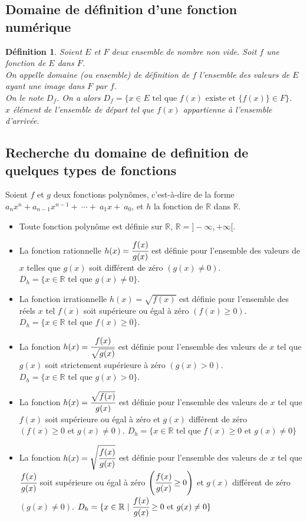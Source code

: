 \documentclass[a4paper, 12pt]{report}
\newtheorem{definition}{Définition}[section]
\begin{document}
            \subsection{Domaine de définition d'une fonction numérique}
            \begin{definition}
                Soient $E$ et $F$ deux ensemble de nombre non vide. Soit $f$ une fonction de $E$ dans $F$.\\ 
                On appelle domaine (ou ensemble) de définition de $f$ l'ensemble des valeurs de $E$ ayant une image dans $F$ par $f$.\\ 
                On le note $D_f$. On a alors $D_f=\{x\in E \text{ tel que } f(x) \text{ existe et } \{f(x)\}\in F \}$.\\ 
                $x$ élément de l'ensemble de départ tel que $f(x)$ appartienne à l'ensemble d'arrivée.
            \end{definition}
            \subsection{Recherche du domaine de definition de quelques types de fonctions}
            Soient $f$ et $g$ deux fonctions polynômes, c'est-à-dire de la forme $a_nx^n+a_{n-1}x^{n-1}+~\cdots+~a_1x+~a_0$, et $h$ la 
            fonction de $\mathbb{R}$ dans $\mathbb{R}$.
            \begin{itemize}
                \item Toute fonction polynôme est définie sur $\mathbb{R}$, \textbf{$\mathbb{R}=]-\infty,+\infty[$}.
                \item La fonction rationnelle $h(x)=\cfrac{f(x)}{g(x)}$ est définie pour l'ensemble des valeurs de $x$ telles que $g(x)$ soit différent 
                de zéro $(g(x)\neq 0)$. \textbf{$D_h=\{x\in\mathbb{R} \text{ tel que }g(x)\neq 0\}$}.
                \item La fonction irrationnelle $h(x)=\sqrt{f(x)}$ est définie pour l'ensemble des réels $x$ tel $f(x)$ soit supérieure ou égal 
                à zéro $(f(x)\geq 0)$. \textbf{$D_h=\{x\in\mathbb{R} \text{ tel que } f(x)\geq 0\}$}.
                \item La fonction $h(x)=\cfrac{f(x)}{\sqrt{g(x)}}$ est définie pour l'ensemble des valeurs de $x$ tel que $g(x)$ soit 
                strictement supérieure à zéro $(g(x)>0)$.  \textbf{$D_h=\{x\in\mathbb{R} \text{ tel que } g(x)>0\}$}.
                \item La fonction $h(x)=\cfrac{\sqrt{f(x)}}{{g(x)}}$ est définie pour l'ensemble des valeurs de $x$ tel que $f(x)$ soit supérieure 
                ou égal à zéro et $g(x)$ différent de zéro $(f(x)\geq 0\text{ et }g(x)\neq 0)$. \textbf{$D_h=\{x\in\mathbb{R}\text{ tel que }f(x)\geq 0 \text{ et }g(x)\neq 0\}$}
                \item La fonction $h(x)=\sqrt{\cfrac{f(x)}{g(x)}}$ est définie pour l'ensemble des valeurs de $x$ tel que $\cfrac{f(x)}{g(x)}$ soit supérieure 
                ou égal à zéro $\left(\cfrac{f(x)}{g(x)}\geq 0\right)$ et $g(x)$ différent de zéro $(g(x)\neq 0)$. 
                $D_h=\{x\in\mathbb{R} \text{ | } \cfrac{f(x)}{g(x)}\geq 0 \text{ et }g(x)\neq 0\}$
            \end{itemize}
\end{document}

